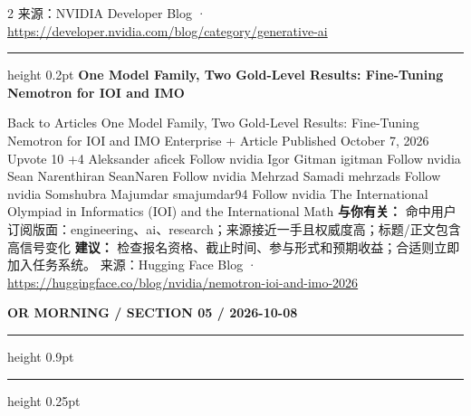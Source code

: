 \documentclass[10.5pt]{ctexart}
\begin{document}
\begin{multicols}{2}
{\footnotesize\color{ormuted} 来源：NVIDIA Developer Blog · \url{https://developer.nvidia.com/blog/category/generative-ai}}
\vspace{2mm}
\hrule height 0.2pt
\vspace{2mm}
{\large\bfseries One Model Family, Two Gold-Level Results: Fine-Tuning Nemotron for IOI and IMO}\par
Back to Articles One Model Family, Two Gold-Level Results: Fine-Tuning Nemotron for IOI and IMO Enterprise + Article Published October 7, 2026 Upvote 10 +4 Aleksander aficek Follow nvidia Igor Gitman igitman Follow nvidia Sean Narenthiran SeanNaren Follow nvidia Mehrzad Samadi mehrzads Follow nvidia Somshubra Majumdar smajumdar94 Follow nvidia The International Olympiad in Informatics (IOI) and the International Math
\textbf{与你有关：} 命中用户订阅版面：engineering、ai、research；来源接近一手且权威度高；标题/正文包含高信号变化
\textbf{建议：} 检查报名资格、截止时间、参与形式和预期收益；合适则立即加入任务系统。
{\footnotesize\color{ormuted} 来源：Hugging Face Blog · \url{https://huggingface.co/blog/nvidia/nemotron-ioi-and-imo-2026}}
\end{multicols}
\newpage
{\small\bfseries OR MORNING / SECTION 05 / 2026-10-08}
\vspace{2mm}
\hrule height 0.9pt
\vspace{1.5mm}
\hrule height 0.25pt
\vspace{4mm}
\end{document}
